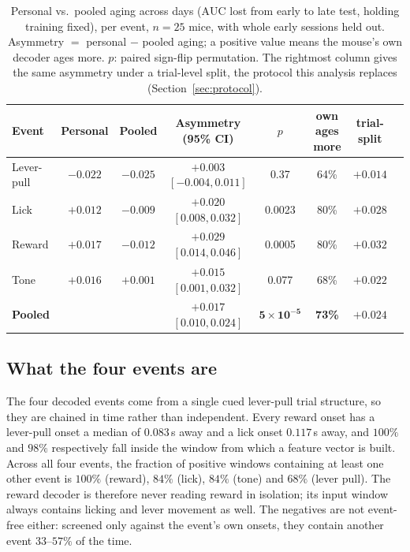 \documentclass[mlabstract,onecolumn]{jmlr}
\newcommand{\auc}{\mathrm{AUC}}
\begin{document}
\begin{table}[t]\centering
\caption{Personal vs.\ pooled aging across days ($\auc$ lost from early to late test, holding
training fixed), per event, $n = 25$ mice, with whole early sessions held out. Asymmetry $=$
personal $-$ pooled aging; a positive value means the mouse's own decoder ages more. $p$: paired
sign-flip permutation. The rightmost column gives the same asymmetry under a trial-level split, the
protocol this analysis replaces (Section~\ref{sec:protocol}).}
\label{tab:asym}
\setlength{\tabcolsep}{4pt}
\begin{tabular}{lccccccc}
\toprule
Event & Personal & Pooled & Asymmetry (95\% CI) & $p$ & own ages more & trial-split \\
\midrule
Lever-pull & $-0.022$ & $-0.025$ & $+0.003$ $[-0.004, 0.011]$ & 0.37 & 64\% & $+0.014$ \\
Lick       & $+0.012$ & $-0.009$ & $+0.020$ $[0.008, 0.032]$ & 0.0023 & 80\% & $+0.028$ \\
Reward     & $+0.017$ & $-0.012$ & $+0.029$ $[0.014, 0.046]$ & 0.0005 & 80\% & $+0.032$ \\
Tone       & $+0.016$ & $+0.001$ & $+0.015$ $[0.001, 0.032]$ & 0.077 & 68\% & $+0.022$ \\
\midrule
\textbf{Pooled} & & & $\mathbf{+0.017}$ $[0.010, 0.024]$ & $\mathbf{5\times10^{-5}}$ & \textbf{73\%} & $+0.024$ \\
\bottomrule
\end{tabular}
\end{table}

\subsection{What the four events are}
\label{sec:events}
The four decoded events come from a single cued lever-pull trial structure, so they are chained in
time rather than independent. Every reward onset has a lever-pull onset a median of $0.083$\,s away
and a lick onset $0.117$\,s away, and $100\%$ and $98\%$ respectively fall inside the window from
which a feature vector is built. Across all four events, the fraction of positive windows containing
at least one other event is $100\%$ (reward), $84\%$ (lick), $84\%$ (tone) and $68\%$ (lever pull).
The reward decoder is therefore never reading reward in isolation; its input window always contains
licking and lever movement as well. The negatives are not event-free either: screened only against
the event's own onsets, they contain another event $33$--$57\%$ of the time.
\end{document}
